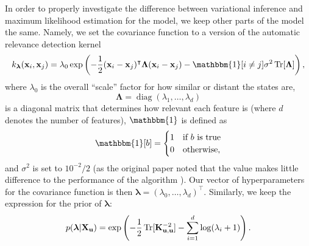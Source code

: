 \documentclass{mprop}
\theoremstyle{definition}
\DeclareMathOperator{\Tr}{Tr}
\DeclareMathOperator{\diag}{diag}
\begin{document}

In order to properly investigate the difference between variational inference
and maximum likelihood estimation for the model, we keep other parts of the
model the same. Namely, we set the covariance function to a version of the
automatic relevance detection kernel
\cite{DBLP:conf/nips/LevinePK11,neal2012bayesian}
\[ k_{\bm\lambda}(\mathbf{x}_i, \mathbf{x}_j) = \lambda_0\exp\left(
    -\frac{1}{2}(\mathbf{x}_i - \mathbf{x}_j)^\intercal\bm\Lambda(\mathbf{x}_i -
    \mathbf{x}_j) - \mathbbm{1}[i \ne j]\sigma^2\Tr[\bm\Lambda] \right), \]
where $\lambda_0$ is the overall ``scale'' factor for how similar or distant the
states are,
\[ \bm\Lambda = \diag(\lambda_1, \dots, \lambda_d) \]
is a diagonal matrix that determines how relevant each feature is (where $d$
denotes the number of features), $\mathbbm{1}$ is defined as
\[ \mathbbm{1}[b] = \begin{cases}
    1 & \mbox{if $b$ is true} \\
    0 & \mbox{otherwise},
  \end{cases} \]
and $\sigma^2$ is set to $10^{-2}/2$ (as the original paper noted that
the value makes little difference to the performance of the algorithm
\cite{DBLP:conf/nips/LevinePK11}). Our vector of hyperparameters for the
covariance function is then $\bm\lambda = (\lambda_0, \dots,
\lambda_d)^\intercal$. Similarly, we keep the expression for the prior of
$\bm\lambda$:
\begin{equation} \label{eq:theta_prior}
  p(\bm\lambda | \mathbf{X_u}) = \exp\left( -\frac{1}{2}\Tr[\Kuu^{-2}] -
    \sum_{i=1}^d \log(\lambda_i + 1) \right).
\end{equation}
\end{document}
